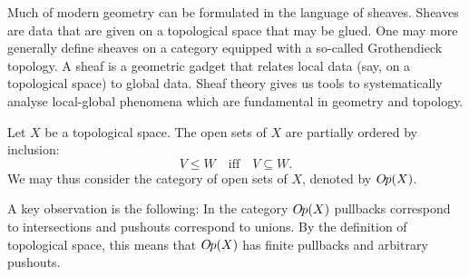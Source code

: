 Much of modern geometry can be formulated in the language of sheaves. Sheaves are data that are given on a topological space that may be glued. One may more generally define sheaves on a category equipped with a so-called Grothendieck topology. A sheaf is a geometric gadget that relates local data (say, on a topological space) to global data. Sheaf theory gives us tools to systematically analyse local-global phenomena which are fundamental in geometry and topology. 

\begin{construction}\label{def:opens}
  Let $X$ be a topological space. The open sets of $X$ are partially ordered by inclusion: \[V \le W \quad \text{iff} \quad V \subseteq W.\]
  We may thus consider the category of open sets of $X$, denoted by $O\kern-0.10em p(X)$.
\end{construction}
A key observation is the following: In the category $O\kern-0.10em p(X)$ pullbacks correspond to intersections and pushouts correspond to unions. By the definition of topological space, this means that $O\kern-0.10em p(X)$ has finite pullbacks and arbitrary pushouts.

